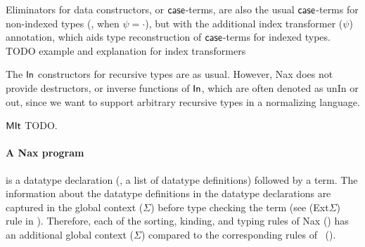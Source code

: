 Eliminators for data constructors, or $\mathsf{case}$-terms, are also the usual
$\mathsf{case}$-terms for non-indexed types (\ie, when $\psi=\cdot$), but with
the additional index transformer ($\psi$) annotation, which aids
type reconstruction of $\mathsf{case}$-terms for indexed types.
TODO example and explanation for index transformers

The $\mathsf{In}$ constructors for recursive types are as usual.
However, Nax does not provide destructors, or inverse functions of $\mathsf{In}$,
which are often denoted as \textsf{unIn} or \textsf{out}, since we want
to support arbitrary recursive types in a normalizing language.

$\mathsf{MIt}$ TODO.

\paragraph{A Nax program} is a datatype declaration (\ie, a list of datatype
definitions) followed by a term. The information about the datatype definitions
in the datatype declarations are captured in the global context ($\Sigma$)
before type checking the term (see (Ext$\Sigma$) rule in ).
Therefore, each of the sorting, kinding, and typing rules of Nax
() has an additional global context ($\Sigma$) compared to
the corresponding rules of \Fi\ ().

